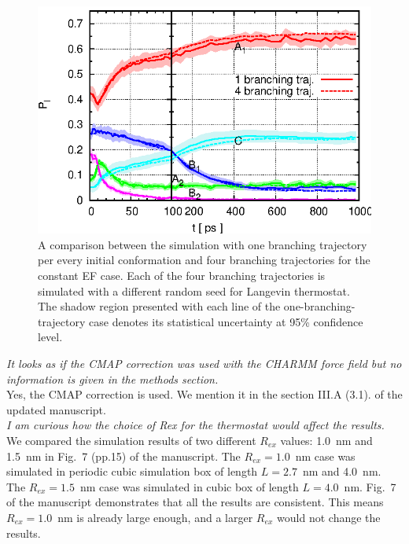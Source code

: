 \documentclass[]{revtex4-1}
\begin{document}
\begin{figure}
  \centering
  \includegraphics{figs/fig-meta-more.eps}
  \caption{A comparison between the simulation with one branching
    trajectory per every initial conformation and four branching
    trajectories  for the
    constant EF case. Each of the four
    branching trajectories is simulated with a different random seed for
    Langevin thermostat.
    The shadow region presented with each line of the one-branching-trajectory case
    denotes its statistical uncertainty at 95\% confidence level.  }
  \label{fig:tmp2}
\end{figure}

\emph{ It looks as if the CMAP correction was used with the CHARMM
  force field but no information is given in the methods section.}\\

Yes, the CMAP correction is used. We mention it in the
section III.A (3.1). of the updated manuscript.
\\

\emph{
I am curious how the choice of Rex for the thermostat would affect the
results.
}\\

We compared the simulation results of two different $R_{ex}$ values:
1.0~nm and 1.5~nm in Fig.~7 (pp.15) of the manuscript. The
$R_{ex}=1.0$~nm case was simulated in periodic cubic simulation box
of length $L=2.7$~nm and 4.0~nm.  The $R_{ex}=1.5$~nm case was
simulated in cubic box of length $L=4.0$~nm. Fig.~7 of the
manuscript demonstrates that all the results are consistent. This
means $R_{ex}=1.0$~nm is already large enough, and a larger $R_{ex}$
would not change the results.\\
\end{document}
